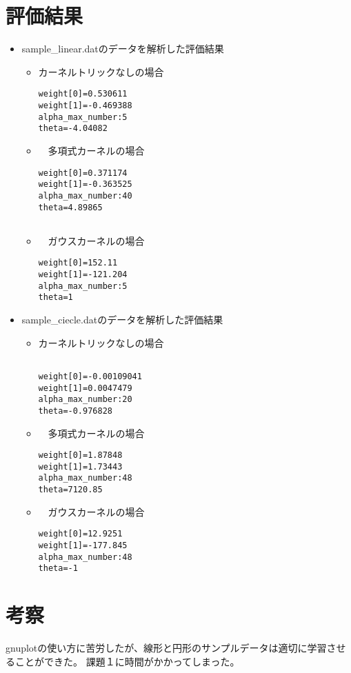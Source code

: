 \documentclass[a4paper,12pt]{jarticle}
\begin{document}
\section{評価結果}

\begin{itemize}
\item sample\_linear.datのデータを解析した評価結果

\begin{itemize}
     \item カーネルトリックなしの場合
\begin{verbatim} 
weight[0]=0.530611
weight[1]=-0.469388
alpha_max_number:5
theta=-4.04082
\end{verbatim}

    \item　多項式カーネルの場合
\begin{verbatim} 
weight[0]=0.371174
weight[1]=-0.363525
alpha_max_number:40
theta=4.89865


\end{verbatim}
     \item　ガウスカーネルの場合
\begin{verbatim} 
weight[0]=152.11
weight[1]=-121.204
alpha_max_number:5
theta=1

\end{verbatim}
   \end{itemize}

\item sample\_ciecle.datのデータを解析した評価結果

\begin{itemize}
   \item カーネルトリックなしの場合
\begin{verbatim} 

weight[0]=-0.00109041
weight[1]=0.0047479
alpha_max_number:20
theta=-0.976828

\end{verbatim}

    \item　多項式カーネルの場合
\begin{verbatim} 
weight[0]=1.87848
weight[1]=1.73443
alpha_max_number:48
theta=7120.85

\end{verbatim}
     \item　ガウスカーネルの場合
\begin{verbatim} 
weight[0]=12.9251
weight[1]=-177.845
alpha_max_number:48
theta=-1

\end{verbatim}
   \end{itemize}
 
    
 
   \end{itemize}
 


\section{考察}
gnuplotの使い方に苦労したが、線形と円形のサンプルデータは適切に学習させることができた。
課題１に時間がかかってしまった。

\end{document}
